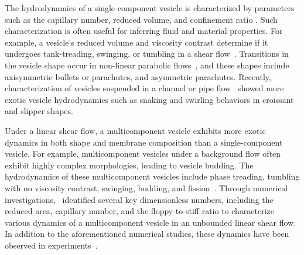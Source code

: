 \documentclass[twoside,twocolumn,9pt]{article}
\begin{document}
The hydrodynamics of a single-component vesicle is characterized by
parameters such as the capillary number, reduced volume, and confinement
ratio \cite{Abreu2014_ACI}.  Such characterization is often useful for
inferring fluid and material properties.
For example, a vesicle's reduced volume and viscosity contrast determine
if it undergoes tank-treading, swinging, or tumbling in a shear
flow~\cite{nog-gom2005}. Transitions in the vesicle shape occur in
non-linear parabolic flows~\cite{kao-bir-mis2009, dan-vla-mis2009}, and
these shapes include axisymmetric bullets or parachutes, and asymmetric
parachutes. Recently, characterization of vesicles suspended in a
channel or pipe flow~\cite{lyu-che-far-jae-mis-leo2023, aga-bir2020,
qua-gan-you2021, abb-far-nai-ezz-ben-mis2022,
wan-ii-sug-nod-jin-liu-che-gon2023} showed more exotic vesicle
hydrodynamics such as snaking and swirling behaviors in croissant and
slipper shapes.

Under a linear shear flow, a multicomponent vesicle exhibits more exotic
dynamics in both shape and membrane composition
\cite{soh-tse-li-voi-low2010,
Smith2007_JChemPhys,Cox2015_Nonlinearity,liu-mar-li-vee-low2017,Tusch2018_PRF,Gera2018_SoftMatter,ger-sal-spa2022}
than a single-component vesicle.  For example, multicomponent vesicles
under a background flow often exhibit highly complex morphologies,
leading to vesicle budding.  The hydrodynamics of these multicomponent
vesicles include phase treading, tumbling with no viscosity contrast,
swinging, budding, and fission~\cite{soh-tse-li-voi-low2010, wan-du2008,
all-ama2006, ger-sal-spa2022, lip1992, urs-klu-phi2009}.  Through
numerical investigations,~\citet{liu-mar-li-vee-low2017}
identified several key dimensionless numbers, including the reduced
area, capillary number, and the floppy-to-stiff ratio to characterize
various dynamics of a multicomponent vesicle in an unbounded linear
shear flow. In addition to the aforementioned numerical studies, these
dynamics have been observed in experiments~\cite{bag-sun2009,
yan-ima-tan2010, yan-ima-tan2008, dre-jah-bob-spa-gop2021}.
\end{document}
